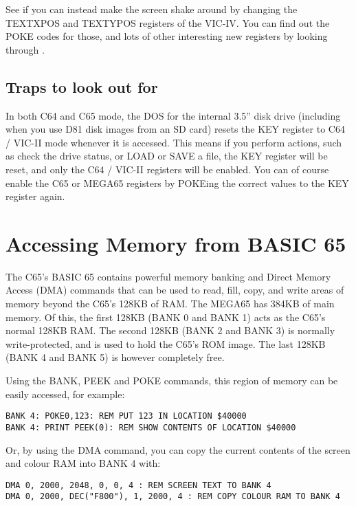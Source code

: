 See if you can instead make the screen shake around by changing the TEXTXPOS and TEXTYPOS registers of
the VIC-IV.  You can find out the POKE codes for those, and lots of other interesting new registers
by looking through .

\subsection{Traps to look out for}

In both C64 and C65 mode, the DOS for the internal 3.5'' disk drive (including when you use D81 disk images from
an SD card) resets the KEY register to C64 / VIC-II mode whenever it is accessed. This means if you perform actions,
such as check the drive status, or LOAD or SAVE a file, the KEY register will be reset, and only the C64 / VIC-II registers
will be enabled. You can of course enable the C65 or MEGA65 registers by POKEing the correct values
to the KEY register again.

\section{Accessing Memory from BASIC 65}

The C65's BASIC 65 contains powerful memory banking and Direct Memory Access (DMA) commands that can be used to read,
fill, copy, and write areas of memory beyond the C65's 128KB of RAM.  The MEGA65 has 384KB of main memory. Of this,
the first 128KB (BANK 0 and BANK 1) acts as the C65's normal 128KB RAM. The second 128KB (BANK 2 and BANK 3) is normally
write-protected, and is used to hold the C65's ROM image.  The last 128KB (BANK 4 and BANK 5) is however completely free.

Using the BANK, PEEK and POKE commands, this region of memory can be easily accessed, for example:

\begin{tcolorbox}[colback=black,coltext=white]
\verbatimfont{\codefont}
\begin{verbatim}
BANK 4: POKE0,123: REM PUT 123 IN LOCATION $40000
BANK 4: PRINT PEEK(0): REM SHOW CONTENTS OF LOCATION $40000
\end{verbatim}
\end{tcolorbox}

Or, by using the DMA command, you can copy the current contents of the screen and colour RAM into BANK 4 with:

\begin{tcolorbox}[colback=black,coltext=white]
\verbatimfont{\codefont}
\begin{verbatim}
DMA 0, 2000, 2048, 0, 0, 4 : REM SCREEN TEXT TO BANK 4
DMA 0, 2000, DEC("F800"), 1, 2000, 4 : REM COPY COLOUR RAM TO BANK 4
\end{verbatim}
\end{tcolorbox}

